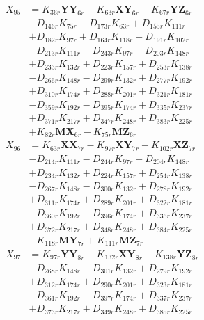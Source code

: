 \begin{multicols}{2}
\begin{align}
X_{95} &= K_{36r}\mathbf{YY}_{6r} - K_{63r}\mathbf{XY}_{6r} - K_{67r}\mathbf{YZ}_{6r}  \nonumber \\
&- D_{146r}K_{75r} - D_{173r}K_{63r} + D_{155r}K_{111r}  \nonumber \\
&+ D_{182r}K_{97r} + D_{164r}K_{118r} + D_{191r}K_{102r}  \nonumber \\
&- D_{213r}K_{111r} - D_{243r}K_{97r} + D_{203r}K_{148r}  \nonumber \\
&+ D_{233r}K_{132r} + D_{223r}K_{157r} + D_{253r}K_{138r}  \nonumber \\
&- D_{266r}K_{148r} - D_{299r}K_{132r} + D_{277r}K_{192r}  \nonumber \\
&+ D_{310r}K_{174r} + D_{288r}K_{201r} + D_{321r}K_{181r}  \nonumber \\
&- D_{359r}K_{192r} - D_{395r}K_{174r} + D_{335r}K_{237r}  \nonumber \\
&+ D_{371r}K_{217r} + D_{347r}K_{248r} + D_{383r}K_{225r}  \nonumber \\
&+ K_{82r}\mathbf{MX}_{6r} - K_{75r}\mathbf{MZ}_{6r} \nonumber \\
X_{96} &= K_{63r}\mathbf{XX}_{7r} - K_{97r}\mathbf{XY}_{7r} - K_{102r}\mathbf{XZ}_{7r}  \nonumber \\
&- D_{214r}K_{111r} - D_{244r}K_{97r} + D_{204r}K_{148r}  \nonumber \\
&+ D_{234r}K_{132r} + D_{224r}K_{157r} + D_{254r}K_{138r}  \nonumber \\
&- D_{267r}K_{148r} - D_{300r}K_{132r} + D_{278r}K_{192r}  \nonumber \\
&+ D_{311r}K_{174r} + D_{289r}K_{201r} + D_{322r}K_{181r}  \nonumber \\
&- D_{360r}K_{192r} - D_{396r}K_{174r} + D_{336r}K_{237r}  \nonumber \\
&+ D_{372r}K_{217r} + D_{348r}K_{248r} + D_{384r}K_{225r}  \nonumber \\
&- K_{118r}\mathbf{MY}_{7r} + K_{111r}\mathbf{MZ}_{7r} \nonumber \\
X_{97} &= K_{97r}\mathbf{YY}_{8r} - K_{132r}\mathbf{XY}_{8r} - K_{138r}\mathbf{YZ}_{8r}  \nonumber \\
&- D_{268r}K_{148r} - D_{301r}K_{132r} + D_{279r}K_{192r}  \nonumber \\
&+ D_{312r}K_{174r} + D_{290r}K_{201r} + D_{323r}K_{181r}  \nonumber \\
&- D_{361r}K_{192r} - D_{397r}K_{174r} + D_{337r}K_{237r}  \nonumber \\
&+ D_{373r}K_{217r} + D_{349r}K_{248r} + D_{385r}K_{225r}  \nonumber \\

\end{align}
\end{multicols}
